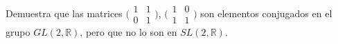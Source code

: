 \question 
Demuestra que las matrices $\bigl(\begin{smallmatrix}
1&1\\ 0&1
\end{smallmatrix} \bigr)$, $\bigl(\begin{smallmatrix}
1&0\\ 1&1
\end{smallmatrix} \bigr)$ son elementos conjugados en el grupo $GL(2,\mathbb{R})$, pero que no lo son en $SL(2,\mathbb{R})$.